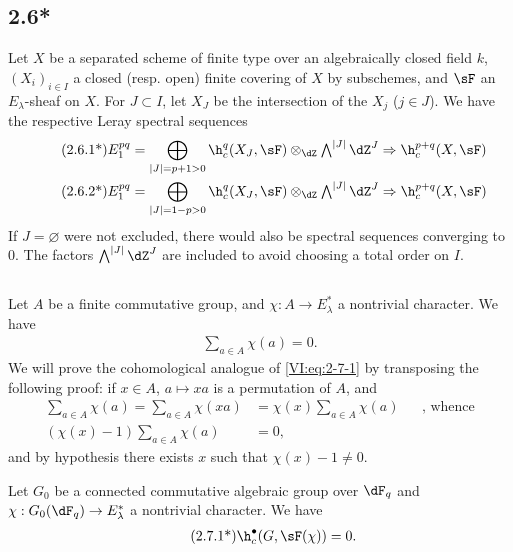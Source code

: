 \subsection*{2.6*}\label{VI:2-6*}

Let $X$ be a separated scheme of finite type over an algebraically closed field $k$, 
$(X_i)_{i\in I}$ a closed (resp. open) finite covering of $X$ by 
subschemes, and $\sF$ an $E_\lambda$-sheaf on $X$. For $J\subset I$, 
let $X_J$ be the intersection of the $X_j$ ($j\in J$). We have the respective 
Leray spectral sequences 
\begin{align*}\tag{2.6.1*}\label{VI:eq:2-6-1*}
  E_1^{p q} &= \bigoplus_{|J|=p+1>0} \h_c^q(X_J,\sF) \otimes_\dZ \textstyle\bigwedge^{|J|} \dZ^J \Rightarrow \h_c^{p+q}(X,\sF) \\ 
  \tag{2.6.2*}\label{VI:eq:2-6-2*}
  E_1^{p q} &= \bigoplus_{|J|=1-p>0} \h_c^q(X_J,\sF) \otimes_\dZ \textstyle\bigwedge^{|J|} \dZ^J \Rightarrow \h_c^{p+q}(X,\sF)
\end{align*}
If $J=\varnothing$ were not excluded, there would also be spectral 
sequences converging to $0$. The factors $\bigwedge^{|J|} \dZ^J$ are included 
to avoid choosing a total order on $I$. 





\subsection{}\label{VI:2-7}

Let $A$ be a finite commutative group, and $\chi:A \to E_\lambda^\ast$ a 
nontrivial character. We have 
\begin{align*}\tag{2.7.1}\label{VI:eq:2-7-1}
  \sum_{a\in A} \chi(a) = 0 \text{.}
\end{align*}
We will prove the cohomological analogue of \eqref{VI:eq:2-7-1} by transposing 
the following proof: if $x\in A$, $a\mapsto x a$ is a permutation of $A$, and 
\begin{align*}
  \sum_{a\in A}\chi(a) = \sum_{a\in A} \chi(x a) &= \chi(x) \sum_{a\in A} \chi(a) && \text{, whence} \\
  (\chi(x)-1)\sum_{a\in A}\chi(a) &= 0 \text{,}
\end{align*}
and by hypothesis there exists $x$ such that $\chi(x)-1\ne 0$. 





\begin{theorem*}[2.7*]\label{VI:2-7*}
Let $G_0$ be a connected commutative algebraic group over $\dF_q$ and 
$\chi:G_0(\dF_q) \to E_\lambda^\ast$ a nontrivial character. We have 
\begin{align*}\tag{2.7.1*}\label{VI:eq:2-7-1*}
  \h_c^\bullet(G,\sF(\chi)) = 0 \text{.}
\end{align*}
\end{theorem*}

